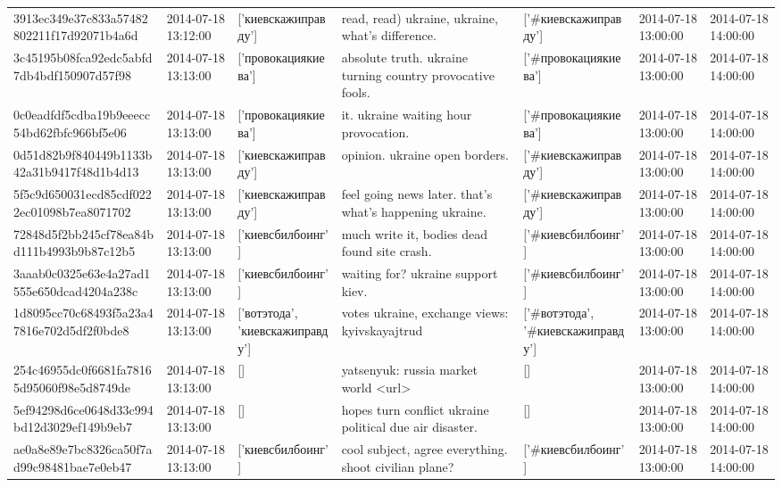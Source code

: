 \begin{tabular}{lllllll}
3913ec349e37c833a57482802211f17d92071b4a6d & 2014-07-18 13:12:00 & ['киевскажиправду'] & read, read) ukraine, ukraine, what's difference. & ['#киевскажиправду'] & 2014-07-18 13:00:00 & 2014-07-18 14:00:00 \\
3c45195b08fca92edc5abfd7db4bdf150907d57f98 & 2014-07-18 13:13:00 & ['провокациякиева'] & absolute truth. ukraine turning country provocative fools. & ['#провокациякиева'] & 2014-07-18 13:00:00 & 2014-07-18 14:00:00 \\
0c0eadfdf5cdba19b9eeecc54bd62fbfc966bf5e06 & 2014-07-18 13:13:00 & ['провокациякиева'] & it. ukraine waiting hour provocation. & ['#провокациякиева'] & 2014-07-18 13:00:00 & 2014-07-18 14:00:00 \\
0d51d82b9f840449b1133b42a31b9417f48d1b4d13 & 2014-07-18 13:13:00 & ['киевскажиправду'] & opinion. ukraine open borders. & ['#киевскажиправду'] & 2014-07-18 13:00:00 & 2014-07-18 14:00:00 \\
5f5c9d650031ecd85cdf0222ec01098b7ea8071702 & 2014-07-18 13:13:00 & ['киевскажиправду'] & feel going news later. that's what's happening ukraine. & ['#киевскажиправду'] & 2014-07-18 13:00:00 & 2014-07-18 14:00:00 \\
72848d5f2bb245cf78ea84bd111b4993b9b87c12b5 & 2014-07-18 13:13:00 & ['киевсбилбоинг'] & much write it, bodies dead found site crash. & ['#киевсбилбоинг'] & 2014-07-18 13:00:00 & 2014-07-18 14:00:00 \\
3aaab0c0325e63e4a27ad1555e650dcad4204a238c & 2014-07-18 13:13:00 & ['киевсбилбоинг'] & waiting for? ukraine support kiev. & ['#киевсбилбоинг'] & 2014-07-18 13:00:00 & 2014-07-18 14:00:00 \\
1d8095cc70c68493f5a23a47816e702d5df2f0bde8 & 2014-07-18 13:13:00 & ['вотэтода', 'киевскажиправду'] & votes ukraine, exchange views: kyivskayajtrud & ['#вотэтода', '#киевскажиправду'] & 2014-07-18 13:00:00 & 2014-07-18 14:00:00 \\
254c46955dc0f6681fa78165d95060f98e5d8749de & 2014-07-18 13:13:00 & [] & yatsenyuk: russia market world <url> & [] & 2014-07-18 13:00:00 & 2014-07-18 14:00:00 \\
5ef94298d6ce0648d33c994bd12d3029ef149b9eb7 & 2014-07-18 13:13:00 & [] & hopes turn conflict ukraine political due air disaster. & [] & 2014-07-18 13:00:00 & 2014-07-18 14:00:00 \\
ae0a8e89e7bc8326ca50f7ad99c98481bae7e0eb47 & 2014-07-18 13:13:00 & ['киевсбилбоинг'] & cool subject, agree everything. shoot civilian plane? & ['#киевсбилбоинг'] & 2014-07-18 13:00:00 & 2014-07-18 14:00:00 \\

\end{tabular}
